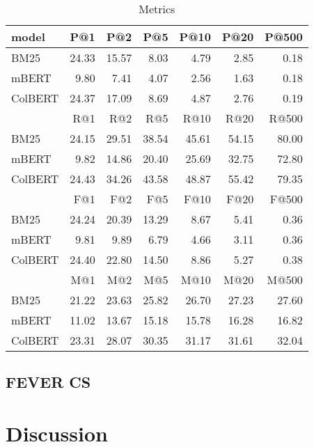 \begin{table}[!htb]
    \centering
    \begin{tabular}{lrrrrrr}
        \toprule
           model &    P@1 &    P@2 &   P@5 &  P@10 &  P@20 &  P@500 \\
        \midrule
            BM25 &  24.33 &  15.57 &  8.03 &  4.79 &  2.85 &   0.18 \\
           mBERT &   9.80 &   7.41 &  4.07 &  2.56 &  1.63 &   0.18 \\
         ColBERT &  24.37 &  17.09 &  8.69 &  4.87 &  2.76 &   0.19 \\
        \midrule
              {} &    R@1 &    R@2 &    R@5 &   R@10 &   R@20 &  R@500 \\
        \midrule
            BM25 &  24.15 &  29.51 &  38.54 &  45.61 &  54.15 &  80.00 \\
           mBERT &   9.82 &  14.86 &  20.40 &  25.69 &  32.75 &  72.80 \\
         ColBERT &  24.43 &  34.26 &  43.58 &  48.87 &  55.42 &  79.35 \\
        \midrule
              {} &    F@1 &    F@2 &    F@5 &   F@10 &   F@20 &   F@500 \\
        \midrule
            BM25 &  24.24 &  20.39 &  13.29 &   8.67 &   5.41 &    0.36 \\
           mBERT &   9.81 &   9.89 &   6.79 &   4.66 &   3.11 &    0.36 \\
         ColBERT &  24.40 &  22.80 &  14.50 &   8.86 &   5.27 &    0.38 \\
        \midrule
              {} &  M@1 &  M@2 &  M@5 &  M@10 &  M@20 &  M@500 \\
        \midrule
            BM25 &  21.22 &  23.63 &  25.82 &   26.70 &   27.23 &    27.60 \\
           mBERT &  11.02 &  13.67 &  15.18 &   15.78 &   16.28 &    16.82 \\
         ColBERT &  23.31 &  28.07 &  30.35 &   31.17 &   31.61 &    32.04 \\
        \bottomrule
        \end{tabular}
    \caption[\CTK{} Metrics]{\CTK{} Metrics}
\end{table}


\subsection{\CTK}
\subsection{FEVER CS}

\section{Discussion}